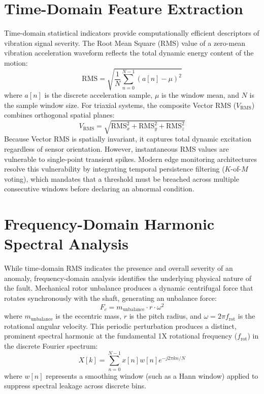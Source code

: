 \section{Time-Domain Feature Extraction}
\hspace{2em}Time-domain statistical indicators provide computationally efficient descriptors of vibration signal severity. The Root Mean Square (RMS) value of a zero-mean vibration acceleration waveform reflects the total dynamic energy content of the motion:
\begin{equation}
\mathrm{RMS} = \sqrt{\frac{1}{N} \sum_{n=0}^{N-1} (a[n] - \mu)^2}
\end{equation}
where $a[n]$ is the discrete acceleration sample, $\mu$ is the window mean, and $N$ is the sample window size. For triaxial systems, the composite Vector RMS ($V_{\mathrm{RMS}}$) combines orthogonal spatial planes:
\begin{equation}
V_{\mathrm{RMS}} = \sqrt{\mathrm{RMS}_x^2 + \mathrm{RMS}_y^2 + \mathrm{RMS}_z^2}
\end{equation}
Because Vector RMS is spatially invariant, it captures total dynamic excitation regardless of sensor orientation. However, instantaneous RMS values are vulnerable to single-point transient spikes. Modern edge monitoring architectures resolve this vulnerability by integrating temporal persistence filtering ($K$-of-$M$ voting), which mandates that a threshold must be breached across multiple consecutive windows before declaring an abnormal condition.

\section{Frequency-Domain Harmonic Spectral Analysis}
\hspace{2em}While time-domain RMS indicates the presence and overall severity of an anomaly, frequency-domain analysis identifies the underlying physical nature of the fault. Mechanical rotor unbalance produces a dynamic centrifugal force that rotates synchronously with the shaft, generating an unbalance force:
\begin{equation}
F_c = m_{\mathrm{unbalance}} \cdot r \cdot \omega^2
\end{equation}
where $m_{\mathrm{unbalance}}$ is the eccentric mass, $r$ is the pitch radius, and $\omega = 2\pi f_{\mathrm{rot}}$ is the rotational angular velocity. This periodic perturbation produces a distinct, prominent spectral harmonic at the fundamental 1X rotational frequency ($f_{\mathrm{rot}}$) in the discrete Fourier spectrum:
\begin{equation}
X[k] = \sum_{n=0}^{N-1} x[n] w[n] e^{-j 2\pi k n / N}
\end{equation}
where $w[n]$ represents a smoothing window (such as a Hann window) applied to suppress spectral leakage across discrete bins.

